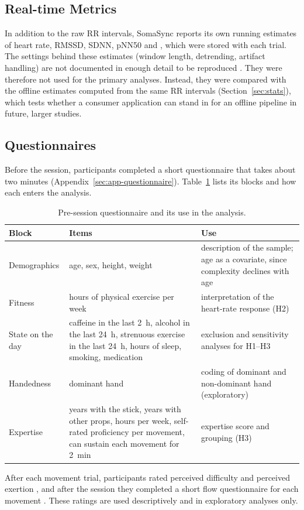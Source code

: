 \subsection{Real-time Metrics}
\label{sec:realtime}

In addition to the raw RR intervals, SomaSync reports its own running estimates of heart rate, RMSSD, SDNN, pNN50 and \al, which were stored with each trial. The settings behind these estimates (window length, detrending, artifact handling) are not documented in enough detail to be reproduced . They were therefore not used for the primary analyses. Instead, they were compared with the offline estimates computed from the same RR intervals (Section~\ref{sec:stats}), which tests whether a consumer application can stand in for an offline pipeline in future, larger studies.

\subsection{Questionnaires}
\label{sec:questionnaires}

Before the session, participants completed a short questionnaire that takes about two minutes (Appendix~\ref{sec:app-questionnaire}). Table~\ref{tab:questionnaire} lists its blocks and how each enters the analysis.

\begin{table}[ht]
\centering
\caption{Pre-session questionnaire and its use in the analysis.}
\label{tab:questionnaire}
\small
\begin{tabularx}{\textwidth}{>{\raggedright\arraybackslash}p{2.6cm} X >{\raggedright\arraybackslash}p{4.4cm}}
\toprule
Block & Items & Use \\
\midrule
Demographics & age, sex, height, weight & description of the sample; age as a covariate, since complexity declines with age \citep{goldberger2002} \\
Fitness & hours of physical exercise per week & interpretation of the heart-rate response (H2) \\
State on the day & caffeine in the last 2~h, alcohol in the last 24~h, strenuous exercise in the last 24~h, hours of sleep, smoking, medication & exclusion and sensitivity analyses for H1--H3 \citep{laborde2017} \\
Handedness & dominant hand & coding of dominant and non-dominant hand (exploratory) \\
Expertise & years with the stick, years with other props, hours per week, self-rated proficiency per movement, can sustain each movement for 2~min & expertise score and grouping (H3) \\
\bottomrule
\end{tabularx}
\end{table}

After each movement trial, participants rated perceived difficulty and perceived exertion , and after the session they completed a short flow questionnaire for each movement . These ratings are used descriptively and in exploratory analyses only.

